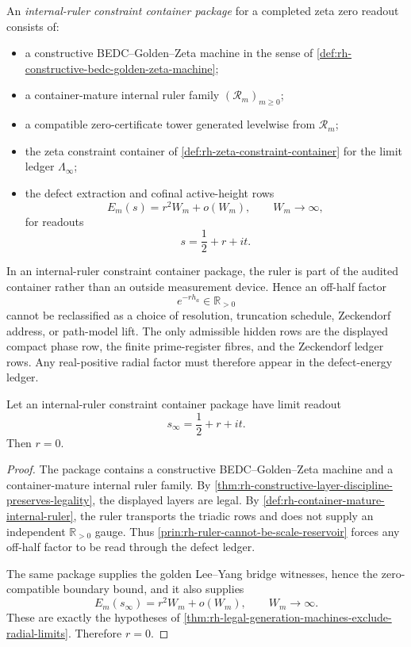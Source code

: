 \begin{definition}
\label{def:rh-internal-ruler-constraint-container-package}
An \emph{internal-ruler constraint container package} for a completed
zeta zero readout consists of:

\begin{itemize}
\item a constructive BEDC--Golden--Zeta machine in the sense of
\autoref{def:rh-constructive-bedc-golden-zeta-machine};
\item a container-mature internal ruler family
$(\mathcal R_m)_{m\ge0}$;
\item a compatible zero-certificate tower generated levelwise from
$\mathcal R_m$;
\item the zeta constraint container of
\autoref{def:rh-zeta-constraint-container} for the limit ledger
$\Lambda_{\infty}$;
\item the defect extraction and cofinal active-height rows
$$
E_m(s)=r^2W_m+o(W_m),
\qquad
W_m\to\infty,
$$
for readouts
$$
s=\frac12+r+it.
$$
\end{itemize}
\end{definition}

\begin{principle}
\label{prin:rh-ruler-cannot-be-scale-reservoir}
In an internal-ruler constraint container package, the ruler is part of
the audited container rather than an outside measurement device.  Hence
an off-half factor
$$
e^{-r h_a}\in\mathbb R_{>0}
$$
cannot be reclassified as a choice of resolution, truncation schedule,
Zeckendorf address, or path-model lift.  The only admissible hidden
rows are the displayed compact phase row, the finite prime-register
fibres, and the Zeckendorf ledger rows.  Any real-positive radial
factor must therefore appear in the defect-energy ledger.
\end{principle}

\begin{theorem}
\label{thm:rh-internal-ruler-containers-exclude-radial-readouts}
Let an internal-ruler constraint container package have limit readout
$$
s_{\infty}=\frac12+r+it.
$$
Then $r=0$.
\end{theorem}

\begin{proof}
The package contains a constructive BEDC--Golden--Zeta machine and a
container-mature internal ruler family.  By
\autoref{thm:rh-constructive-layer-discipline-preserves-legality}, the
displayed layers are legal.  By
\autoref{def:rh-container-mature-internal-ruler}, the ruler transports
the triadic rows and does not supply an independent
$\mathbb R_{>0}$ gauge.  Thus
\autoref{prin:rh-ruler-cannot-be-scale-reservoir} forces any off-half
factor to be read through the defect ledger.

The same package supplies the golden Lee--Yang bridge witnesses, hence
the zero-compatible boundary bound, and it also supplies
$$
E_m(s_{\infty})=r^2W_m+o(W_m),
\qquad
W_m\to\infty.
$$
These are exactly the hypotheses of
\autoref{thm:rh-legal-generation-machines-exclude-radial-limits}.
Therefore $r=0$.
\end{proof}

